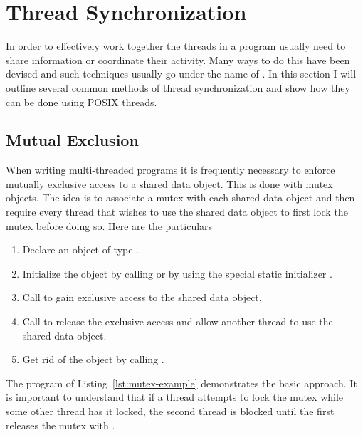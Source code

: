 
\section{Thread Synchronization}
\label{sec:thread-synchronization}

In order to effectively work together the threads in a program usually need to share information
or coordinate their activity. Many ways to do this have been devised and such techniques usually
go under the name of . In this section I will outline several
common methods of thread synchronization and show how they can be done using POSIX threads.

\subsection{Mutual Exclusion}
\label{subsec:mutual-exclusion}

When writing multi-threaded programs it is frequently necessary to enforce mutually exclusive
access to a shared data object. This is done with mutex objects. The idea is to associate a
mutex with each shared data object and then require every thread that wishes to use the shared
data object to first lock the mutex before doing so. Here are the particulars

\begin{enumerate}

\item Declare an object of type .

\item Initialize the object by calling  or by using the special
  static initializer .
  
\item Call  to gain exclusive access to the shared data object.

\item Call  to release the exclusive access and allow another
  thread to use the shared data object.

\item Get rid of the object by calling .

\end{enumerate}

The program of Listing~\ref{lst:mutex-example} demonstrates the basic approach. It is important
to understand that if a thread attempts to lock the mutex while some other thread has it locked,
the second thread is blocked until the first releases the mutex with
.

